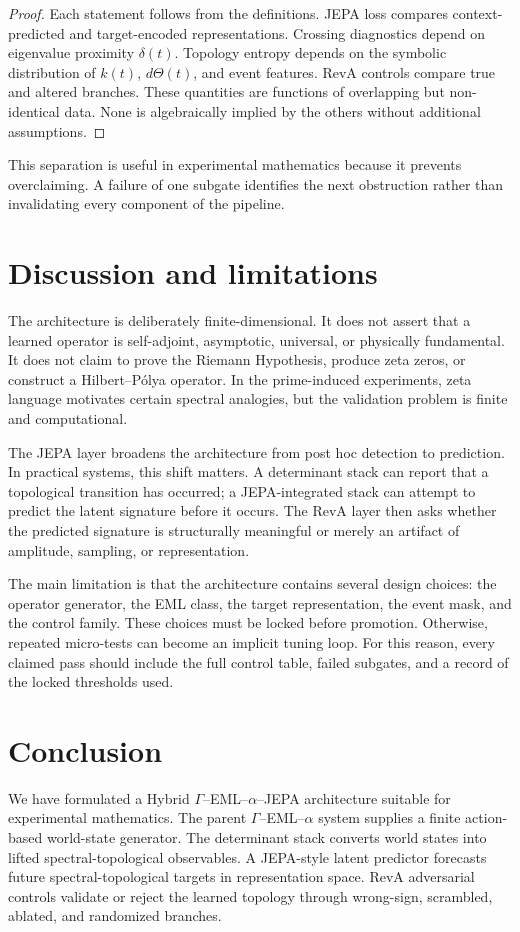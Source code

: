 \documentclass[11pt]{article}
\begin{document}
\begin{proof}
Each statement follows from the definitions. JEPA loss compares context-predicted and target-encoded representations. Crossing diagnostics depend on eigenvalue proximity $\delta(t)$. Topology entropy depends on the symbolic distribution of $k(t)$, $d\Theta(t)$, and event features. RevA controls compare true and altered branches. These quantities are functions of overlapping but non-identical data. None is algebraically implied by the others without additional assumptions.
\end{proof}

This separation is useful in experimental mathematics because it prevents overclaiming. A failure of one subgate identifies the next obstruction rather than invalidating every component of the pipeline.

\section{Discussion and limitations}
The architecture is deliberately finite-dimensional. It does not assert that a learned operator is self-adjoint, asymptotic, universal, or physically fundamental. It does not claim to prove the Riemann Hypothesis, produce zeta zeros, or construct a Hilbert--Pólya operator. In the prime-induced experiments, zeta language motivates certain spectral analogies, but the validation problem is finite and computational.

The JEPA layer broadens the architecture from post hoc detection to prediction. In practical systems, this shift matters. A determinant stack can report that a topological transition has occurred; a JEPA-integrated stack can attempt to predict the latent signature before it occurs. The RevA layer then asks whether the predicted signature is structurally meaningful or merely an artifact of amplitude, sampling, or representation.

The main limitation is that the architecture contains several design choices: the operator generator, the EML class, the target representation, the event mask, and the control family. These choices must be locked before promotion. Otherwise, repeated micro-tests can become an implicit tuning loop. For this reason, every claimed pass should include the full control table, failed subgates, and a record of the locked thresholds used.

\section{Conclusion}
We have formulated a Hybrid $\Gamma$--EML--$\alpha$--JEPA architecture suitable for experimental mathematics. The parent $\Gamma$--EML--$\alpha$ system supplies a finite action-based world-state generator. The determinant stack converts world states into lifted spectral-topological observables. A JEPA-style latent predictor forecasts future spectral-topological targets in representation space. RevA adversarial controls validate or reject the learned topology through wrong-sign, scrambled, ablated, and randomized branches.
\end{document}
